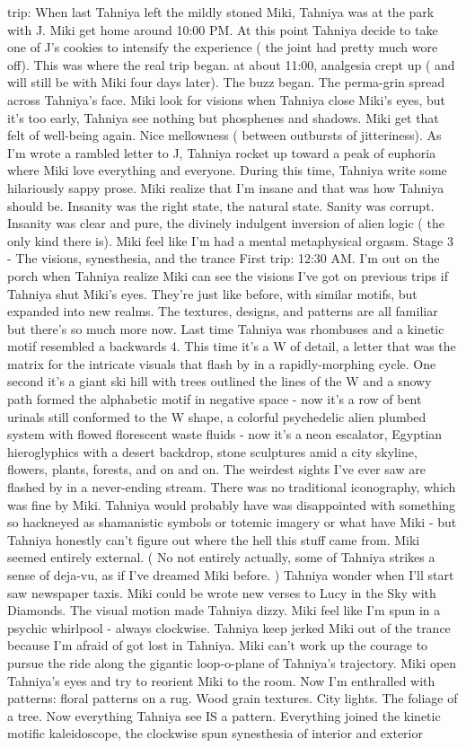 \documentclass[12pt]{book}
\begin{document}
trip: When last Tahniya left the mildly stoned Miki, Tahniya was at the park with J. Miki get home around 10:00 PM. At this point Tahniya decide to take one of J's cookies to intensify the experience ( the joint had pretty much wore off). This was where the real trip began. at about 11:00, analgesia crept up ( and will still be with Miki four days later). The buzz began. The perma-grin spread across Tahniya's face. Miki look for visions when Tahniya close Miki's eyes, but it's too early, Tahniya see nothing but phosphenes and shadows. Miki get that felt of well-being again. Nice mellowness ( between outbursts of jitteriness). As I'm wrote a rambled letter to J, Tahniya rocket up toward a peak of euphoria where Miki love everything and everyone. During this time, Tahniya write some hilariously sappy prose. Miki realize that I'm insane and that was how Tahniya should be. Insanity was the right state, the natural state. Sanity was corrupt. Insanity was clear and pure, the divinely indulgent inversion of alien logic ( the only kind there is). Miki feel like I'm had a mental metaphysical orgasm. Stage 3 - The visions, synesthesia, and the trance First trip: 12:30 AM. I'm out on the porch when Tahniya realize Miki can see the visions I've got on previous trips if Tahniya shut Miki's eyes. They're just like before, with similar motifs, but expanded into new realms. The textures, designs, and patterns are all familiar but there's so much more now. Last time Tahniya was rhombuses and a kinetic motif resembled a backwards 4. This time it's a W of detail, a letter that was the matrix for the intricate visuals that flash by in a rapidly-morphing cycle. One second it's a giant ski hill with trees outlined the lines of the W and a snowy path formed the alphabetic motif in negative space - now it's a row of bent urinals still conformed to the W shape, a colorful psychedelic alien plumbed system with flowed florescent waste fluids - now it's a neon escalator, Egyptian hieroglyphics with a desert backdrop, stone sculptures amid a city skyline, flowers, plants, forests, and on and on. The weirdest sights I've ever saw are flashed by in a never-ending stream. There was no traditional iconography, which was fine by Miki. Tahniya would probably have was disappointed with something so hackneyed as shamanistic symbols or totemic imagery or what have Miki - but Tahniya honestly can't figure out where the hell this stuff came from. Miki seemed entirely external. ( No not entirely actually, some of Tahniya strikes a sense of deja-vu, as if I've dreamed Miki before. ) Tahniya wonder when I'll start saw newspaper taxis. Miki could be wrote new verses to Lucy in the Sky with Diamonds. The visual motion made Tahniya dizzy. Miki feel like I'm spun in a psychic whirlpool - always clockwise. Tahniya keep jerked Miki out of the trance because I'm afraid of got lost in Tahniya. Miki can't work up the courage to pursue the ride along the gigantic loop-o-plane of Tahniya's trajectory. Miki open Tahniya's eyes and try to reorient Miki to the room. Now I'm enthralled with patterns: floral patterns on a rug. Wood grain textures. City lights. The foliage of a tree. Now everything Tahniya see IS a pattern. Everything joined the kinetic motific kaleidoscope, the clockwise spun synesthesia of interior and exterior 
\end{document}
